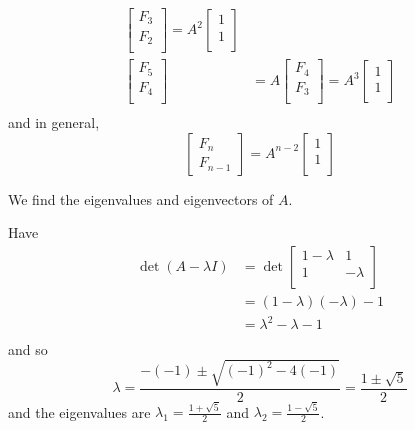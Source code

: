 \documentclass{article}
\begin{document}
\begin{example}
\begin{align*}
\begin{bmatrix}
          F_3\\
          F_2\\
        \end{bmatrix} = A^2
        \begin{bmatrix}
          1\\1\\
        \end{bmatrix}\\
        \begin{bmatrix}
          F_5\\
          F_4\\
        \end{bmatrix} &= A
        \begin{bmatrix}
          F_4\\
          F_3\\
        \end{bmatrix} = A^3
        \begin{bmatrix}
          1\\1\\
        \end{bmatrix}\\
      \end{align*} and in general, \[
        \begin{bmatrix}
          F_n\\F_{n-1}
        \end{bmatrix} = A^{n-2}
        \begin{bmatrix}
          1\\1\\
        \end{bmatrix}
      \]

      We find the eigenvalues and eigenvectors of $A$.

      Have
      \begin{align*}
        \det (A - \lambda I) &= \det
        \begin{bmatrix}
          1 - \lambda & 1\\
          1 & -\lambda\\
        \end{bmatrix}\\
        &= (1-\lambda)(-\lambda) - 1\\
        &= \lambda^2 - \lambda - 1\\
      \end{align*} and so \[
        \lambda = \frac{-(-1) \pm \sqrt{(-1)^2 -4(-1)}}{2} = \frac{1 \pm \sqrt{5}}{2}
      \] and the eigenvalues are $\lambda_1 = \frac{1 + \sqrt{5}}{2}$ and $\lambda_2 = \frac{1 - \sqrt{5}}{2}$.


\end{example}
\end{document}

